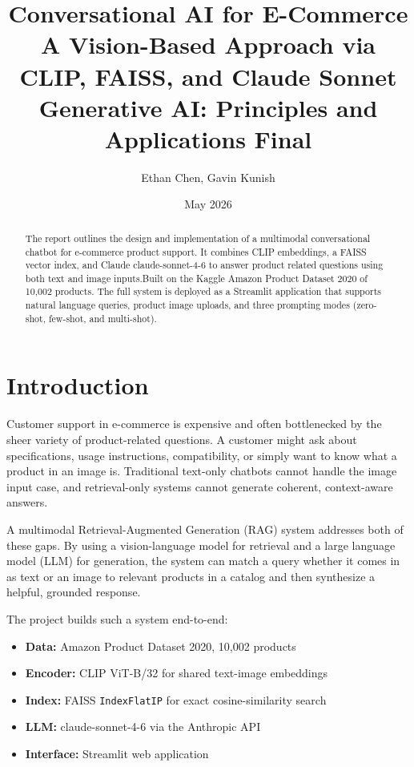 \documentclass[11pt]{article}
\title{
    \textbf{Conversational AI for E-Commerce} \\
    \large A Vision-Based Approach via CLIP, FAISS, and Claude Sonnet\\[0.5em]
    \normalsize Generative AI: Principles and Applications Final
}
\author{Ethan Chen, Gavin Kunish}
\date{May 2026}
\begin{document}
\maketitle

\begin{abstract}
The report outlines the design and implementation of a multimodal conversational chatbot
for e-commerce product support. It combines CLIP embeddings, a FAISS vector index, and Claude claude-sonnet-4-6 to answer product related questions using both text and image inputs.Built on the Kaggle Amazon Product Dataset 2020 of 10,002 products. The full system is deployed
as a Streamlit application that supports natural language queries, product image uploads, and
three prompting modes (zero-shot, few-shot, and multi-shot).
\end{abstract}

\tableofcontents
\newpage

\section{Introduction}

Customer support in e-commerce is expensive and often bottlenecked by the sheer variety of
product-related questions. A customer might ask about specifications, usage instructions,
compatibility, or simply want to know what a product in an image is. Traditional text-only
chatbots cannot handle the image input case, and retrieval-only systems cannot generate
coherent, context-aware answers.

A multimodal Retrieval-Augmented Generation (RAG) system addresses both of these gaps.
By using a vision-language model for retrieval and a large language model (LLM) for generation,
the system can match a query whether it comes in as text or an image to relevant products in
a catalog and then synthesize a helpful, grounded response.

The project builds such a system end-to-end:
\begin{itemize}
    \item \textbf{Data:} Amazon Product Dataset 2020, 10,002 products
    \item \textbf{Encoder:} CLIP ViT-B/32 for shared text-image embeddings
    \item \textbf{Index:} FAISS \texttt{IndexFlatIP} for exact cosine-similarity search
    \item \textbf{LLM:} claude-sonnet-4-6 via the Anthropic API
    \item \textbf{Interface:} Streamlit web application
\end{itemize}
\end{document}
